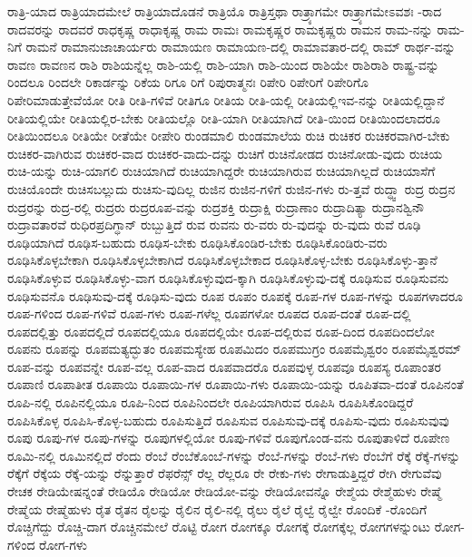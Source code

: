 {ರಾತ್ರಿ-ಯಾದ
ರಾತ್ರಿಯಾದಮೇಲೆ
ರಾತ್ರಿಯಾದೊಡನೆ
ರಾತ್ರಿಯೊ
ರಾತ್ರಿಸ್ತಥಾ
ರಾತ್ರ್ಯಾಗಮೇ
ರಾತ್ರ್ಯಾಗಮೇಽವಶಃ
-ರಾದ
ರಾದವರನ್ನು
ರಾದವರೆ
ರಾಧಕೃಷ್ಣ
ರಾಧಾಕೃಷ್ಣ
ರಾಮ
ರಾಮಃ
ರಾಮಕೃಷ್ಣರ
ರಾಮಕೃಷ್ಣರು
ರಾಮನ
ರಾಮ-ನನ್ನು
ರಾಮ-ನಿಗೆ
ರಾಮನೆ
ರಾಮಾನುಜಾಚಾರ್ಯರು
ರಾಮಾಯಣ
ರಾಮಾಯಣ-ದಲ್ಲಿ
ರಾಮಾವತಾರ-ದಲ್ಲಿ
ರಾಮ್
ರಾರ್ಥ-ವನ್ನು
ರಾವಣ
ರಾವಣನ
ರಾಶಿ
ರಾಶಿಯನ್ನೆಲ್ಲ
ರಾಶಿ-ಯಲ್ಲಿ
ರಾಶಿ-ಯಾಗಿ
ರಾಶಿ-ಯಿಂದ
ರಾಶಿಯೇ
ರಾಶಿರಾಶಿ
ರಾಷ್ಟ್ರ-ವನ್ನು
ರಿಂದಲೂ
ರಿಂದಲೇ
ರಿಕಾರ್ಡನ್ನು
ರಿಕೆಯ
ರಿಗೂ
ರಿಗೆ
ರಿಪುರಾತ್ಮನಃ
ರಿಪೇರಿ
ರಿಪೇರಿಗೆ
ರಿಪೇರಿಗೊ
ರಿಪೇರಿಮಾಡುತ್ತೇವೆಯೋ
ರೀತಿ
ರೀತಿ-ಗಳಿವೆ
ರೀತಿಗೂ
ರೀತಿಯ
ರೀತಿ-ಯಲ್ಲಿ
ರೀತಿಯಲ್ಲಿಇವ-ನನ್ನು
ರೀತಿಯಲ್ಲಿದ್ದಾನೆ
ರೀತಿಯಲ್ಲಿಯೇ
ರೀತಿಯಲ್ಲಿರ-ಬೇಕು
ರೀತಿಯಲ್ಲೊ
ರೀತಿ-ಯಾಗಿ
ರೀತಿಯಾಗಿದೆ
ರೀತಿ-ಯಿಂದ
ರೀತಿಯಿಂದಲಾದರೂ
ರೀತಿಯಿಂದಲೂ
ರೀತಿಯೇ
ರೀತೆಯೇ
ರೀಪೇರಿ
ರುಂಡಮಾಲಿ
ರುಂಡಮಾಲೆಯ
ರುಚಿ
ರುಚಿಕರ
ರುಚಿಕರವಾಗಿರ-ಬೇಕು
ರುಚಿಕರ-ವಾಗಿರುವ
ರುಚಿಕರ-ವಾದ
ರುಚಿಕರ-ವಾದು-ದನ್ನು
ರುಚಿಗೆ
ರುಚಿನೋಡದ
ರುಚಿನೋಡು-ವುದು
ರುಚಿಯ
ರುಚಿ-ಯನ್ನು
ರುಚಿ-ಯಾಗಲಿ
ರುಚಿಯಾಗಿದೆ
ರುಚಿಯಾಗಿದ್ದರೇ
ರುಚಿಯಾಗಿರುವ
ರುಚಿಯಾಗಿಲ್ಲದೆ
ರುಚಿಯಾಸೆಗೆ
ರುಚಿಯೊಂದೇ
ರುಚಿಸಬಲ್ಲುದು
ರುಚಿಸು-ವುದಿಲ್ಲ
ರುಜಿನ
ರುಜಿನ-ಗಳಿಗೆ
ರುಜಿನ-ಗಳು
ರು-ತ್ತವೆ
ರುದ್ಧ್ವಾ
ರುದ್ರ
ರುದ್ರನ
ರುದ್ರರನ್ನು
ರುದ್ರ-ರಲ್ಲಿ
ರುದ್ರರು
ರುದ್ರರೂಪ-ವನ್ನು
ರುದ್ರಶಕ್ತಿ
ರುದ್ರಾಕ್ಷಿ
ರುದ್ರಾಣಾಂ
ರುದ್ರಾದಿತ್ಯಾ
ರುದ್ರಾನಶ್ವಿನೌ
ರುದ್ರಾವತಾರವೆ
ರುಧಿರಪ್ರದಿಗ್ಧಾನ್
ರುಬ್ಬುತ್ತಿದೆ
ರುವ
ರುವನು
ರು-ವರು
ರು-ವುದನ್ನು
ರು-ವುದು
ರುವೆ
ರೂಢಿ
ರೂಢಿಯಾಗಿದೆ
ರೂಢಿಸ-ಬಹುದು
ರೂಢಿಸ-ಬೇಕು
ರೂಢಿಸಿಕೊಂಡಿರ-ಬೇಕು
ರೂಢಿಸಿಕೊಂಡಿರು-ವರು
ರೂಢಿಸಿಕೊಳ್ಳಬೇಕಾಗಿ
ರೂಢಿಸಿಕೊಳ್ಳಬೇಕಾಗಿದೆ
ರೂಢಿಸಿಕೊಳ್ಳಬೇಕಾದ
ರೂಢಿಸಿಕೊಳ್ಳ-ಬೇಕು
ರೂಢಿಸಿಕೊಳ್ಳು-ತ್ತಾನೆ
ರೂಢಿಸಿಕೊಳ್ಳುವ
ರೂಢಿಸಿಕೊಳ್ಳು-ವಾಗ
ರೂಢಿಸಿಕೊಳ್ಳುವುದ-ಕ್ಕಾಗಿ
ರೂಢಿಸಿಕೊಳ್ಳುವು-ದಕ್ಕೆ
ರೂಢಿಸುವ
ರೂಢಿಸುವನು
ರೂಢಿಸುವನೊ
ರೂಢಿಸುವು-ದಕ್ಕೆ
ರೂಢಿಸು-ವುದು
ರೂಪ
ರೂಪಂ
ರೂಪಕ್ಕೆ
ರೂಪ-ಗಳ
ರೂಪ-ಗಳನ್ನು
ರೂಪಗಳಾದರೂ
ರೂಪ-ಗಳಿಂದ
ರೂಪ-ಗಳಿವೆ
ರೂಪ-ಗಳು
ರೂಪ-ಗಳೆಲ್ಲ
ರೂಪಗಳೋ
ರೂಪದ
ರೂಪ-ದಂತೆ
ರೂಪ-ದಲ್ಲಿ
ರೂಪದಲ್ಲಿತ್ತು
ರೂಪದಲ್ಲಿದೆ
ರೂಪದಲ್ಲಿಯೂ
ರೂಪದಲ್ಲಿಯೇ
ರೂಪ-ದಲ್ಲಿರುವ
ರೂಪ-ದಿಂದ
ರೂಪದಿಂದಲೋ
ರೂಪನು
ರೂಪನ್ನು
ರೂಪಮತ್ಯದ್ಭುತಂ
ರೂಪಮಸ್ಯೇಹ
ರೂಪಮಿದಂ
ರೂಪಮುಗ್ರಂ
ರೂಪಮೈಶ್ವರಂ
ರೂಪಮೈಶ್ವರಮ್
ರೂಪ-ವನ್ನು
ರೂಪವನ್ನೇ
ರೂಪ-ವಲ್ಲ
ರೂಪ-ವಾದ
ರೂಪವಾದರೊ
ರೂಪವುಳ್ಳ
ರೂಪವೂ
ರೂಪಸ್ಯ
ರೂಪಾಂತರ
ರೂಪಾಣಿ
ರೂಪಾತೀತ
ರೂಪಾಯಿ
ರೂಪಾಯಿ-ಗಳ
ರೂಪಾಯಿ-ಗಳು
ರೂಪಾಯಿ-ಯನ್ನು
ರೂಪಿತವಾ-ದಂತೆ
ರೂಪಿನಂತೆ
ರೂಪಿ-ನಲ್ಲಿ
ರೂಪಿನಲ್ಲಿಯೂ
ರೂಪಿ-ನಿಂದ
ರೂಪಿನಿಂದಲೇ
ರೂಪಿಯಾಗಿರುವ
ರೂಪಿಸಿ
ರೂಪಿಸಿಕೊಂಡಿದ್ದರೆ
ರೂಪಿಸಿಕೊಳ್ಳ
ರೂಪಿಸಿ-ಕೊಳ್ಳ-ಬಹುದು
ರೂಪಿಸುತ್ತಿದೆ
ರೂಪಿಸುವ
ರೂಪಿಸುವು-ದಕ್ಕೆ
ರೂಪಿಸು-ವುದು
ರೂಪಿಸುವುವು
ರೂಪು
ರೂಪು-ಗಳ
ರೂಪು-ಗಳನ್ನು
ರೂಪುಗಳಲ್ಲಿಯೋ
ರೂಪು-ಗಳಿವೆ
ರೂಪುಗೊಂಡ-ವನು
ರೂಪುತಾಳಿದೆ
ರೂಪೇಣ
ರೂಮಿ-ನಲ್ಲಿ
ರೂಮಿನಲ್ಲಿದೆ
ರೆಂದು
ರೆಂಬೆ
ರೆಂಬೆಕೊಂಬೆ-ಗಳನ್ನು
ರೆಂಬೆ-ಗಳನ್ನು
ರೆಂಬೆ-ಗಳು
ರೆಂಬೆಗೆ
ರೆಕ್ಕೆ
ರೆಕ್ಕೆ-ಗಳನ್ನು
ರೆಕ್ಕೆಗೆ
ರೆಕ್ಕೆಯ
ರೆಕ್ಕೆ-ಯನ್ನು
ರೆನ್ನುತ್ತಾರೆ
ರೆಫರೆನ್ಸ್
ರೆಲ್ಲ
ರೆಲ್ಲರೂ
ರೇ
ರೇಕು-ಗಳು
ರೇಗಾಡುತ್ತಿದ್ದರೆ
ರೇಗಿ
ರೇಗುವೆವು
ರೇಚಕ
ರೇಡಿಯೇಷನ್ನಂತೆ
ರೇಡಿಯೊ
ರೇಡಿಯೋ
ರೇಡಿಯೋ-ವನ್ನು
ರೇಡಿಯೋವನ್ನೊ
ರೇಶ್ಮೆಯ
ರೇಶ್ಮೆಹುಳು
ರೇಷ್ಮೆ
ರೇಷ್ಮೆಯ
ರೇಷ್ಮೆಹುಳು
ರೈತ
ರೈತನ
ರೈಲನ್ನು
ರೈಲಿನ
ರೈಲಿ-ನಲ್ಲಿ
ರೈಲು
ರೈಲೆ
ರೈಲ್ವೆ
ರೈಲ್ವೇ
ರೊಂದಿಕೆ
-ರೊಂದಿಗೆ
ರೊಚ್ಚಿಗೆದ್ದು
ರೊಚ್ಚಿ-ದಾಗ
ರೊಚ್ಚಿನಮೇಲೆ
ರೊಟ್ಟಿ
ರೋಗ
ರೋಗಕ್ಕೂ
ರೋಗಕ್ಕೆ
ರೋಗಕ್ಕೆಲ್ಲ
ರೋಗಗಳನ್ನುಂಟು
ರೋಗ-ಗಳಿಂದ
ರೋಗ-ಗಳು
}
